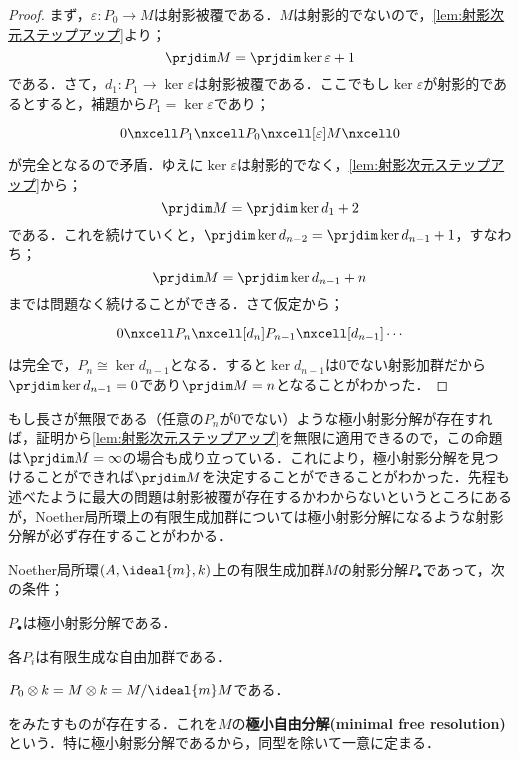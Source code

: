 \begin{proof}
	まず，$\varepsilon:P_0\to M$は射影被覆である．$M$は射影的でないので，\ref{lem:射影次元ステップアップ}より；
	\[\prjdim M=\prjdim\ker\varepsilon+1\]
	である．さて，$d_1:P_1\to\ker\varepsilon$は射影被覆である．ここでもし$\ker\varepsilon$が射影的であるとすると，補題から$P_1=\ker\varepsilon$であり；
	\[\begin{tikzcd}
	0\nxcell P_1\nxcell P_0\nxcell[\varepsilon]M\nxcell0 
	\end{tikzcd}\]
	が完全となるので矛盾．ゆえに$\ker\varepsilon$は射影的でなく，\ref{lem:射影次元ステップアップ}から；
	\[\prjdim M=\prjdim \ker d_1+2\]
	である．これを続けていくと，$\prjdim \ker d_{n-2}=\prjdim \ker d_{n-1}+1$，すなわち；
	\[\prjdim M=\prjdim \ker d_{n-1}+n\]
	までは問題なく続けることができる．さて仮定から；
	\[\begin{tikzcd}
	0\nxcell P_n\nxcell[d_n]P_{n-1}\nxcell[d_{n-1}]\cdots 
	\end{tikzcd}\]
	は完全で，$P_n\cong\ker d_{n-1}$となる．すると$\ker d_{n-1}$は$0$でない射影加群だから$\prjdim\ker d_{n-1}=0$であり$\prjdim M=n$となることがわかった．
\end{proof}

もし長さが無限である（任意の$P_n$が$0$でない）ような極小射影分解が存在すれば，証明から\ref{lem:射影次元ステップアップ}を無限に適用できるので，この命題は$\prjdim M=\infty$の場合も成り立っている．これにより，極小射影分解を見つけることができれば$\prjdim M$を決定することができることがわかった．先程も述べたように最大の問題は射影被覆が存在するかわからないというところにあるが，Noether局所環上の有限生成加群については極小射影分解になるような射影分解が必ず存在することがわかる．

\begin{thm}[極小自由分解]\label{thm:極小自由分解}
	Noether局所環$(A,\ideal{m},k)$上の有限生成加群$M$の射影分解$P_\bullet$であって，次の条件；
	\begin{sakura}
		\item $P_\bullet$は極小射影分解である．
		\item 各$P_i$は有限生成な自由加群である．
		\item $P_0\otimes k=M\otimes k=M/\ideal{m}M$である．
	\end{sakura}
	をみたすものが存在する．これを$M$の\textbf{極小自由分解(minimal free resolution)}という．特に極小射影分解であるから，同型を除いて一意に定まる．
\end{thm}

